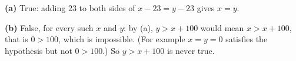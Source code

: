 \textbf{(a)} True: adding $23$ to both sides of $x-23=y-23$ gives $\boxed{x=y}$.

\textbf{(b)} False, for every such $x$ and $y$: by (a), $y>x+100$ would mean $x>x+100$, that is $0>100$, which is impossible. (For example $x=y=0$ satisfies the hypothesis but not $0>100$.) So $y>x+100$ is $\boxed{\text{never true}}$.
